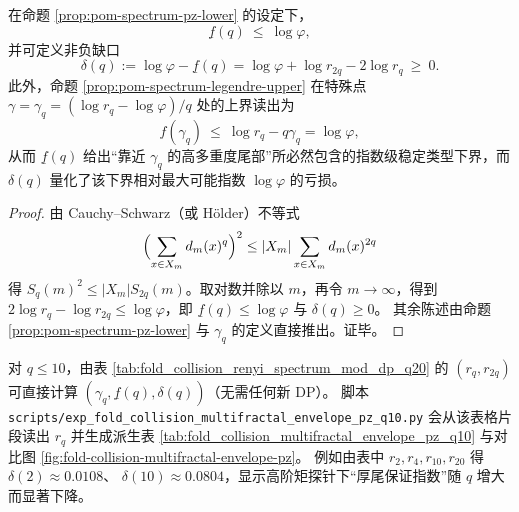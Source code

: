 \begin{corollary}\label{cor:pom-spectrum-intermittency-deficit}
在命题 \ref{prop:pom-spectrum-pz-lower} 的设定下，
\[
\underline f(q)\ \le\ \log\varphi,
\]
并可定义非负缺口
\[
\boxed{\;
\delta(q):=\log\varphi-\underline f(q)
=\log\varphi+\log r_{2q}-2\log r_q\ \ge\ 0.\;}
\]
此外，命题 \ref{prop:pom-spectrum-legendre-upper} 在特殊点
\(
\gamma=\gamma_q=(\log r_q-\log\varphi)/q
\)
处的上界读出为
\[
f(\gamma_q)\ \le\ \log r_q-q\gamma_q=\log\varphi,
\]
从而 \(\underline f(q)\) 给出“靠近 \(\gamma_q\) 的高多重度尾部”所必然包含的指数级稳定类型下界，而 \(\delta(q)\) 量化了该下界相对最大可能指数 \(\log\varphi\) 的亏损。
\end{corollary}
\begin{proof}
由 Cauchy--Schwarz（或 Hölder）不等式
\[
\Bigl(\sum_{x\in X_m}d_m(x)^q\Bigr)^2\le |X_m|\sum_{x\in X_m}d_m(x)^{2q}
\]
得 \(S_q(m)^2\le |X_m|S_{2q}(m)\)。取对数并除以 \(m\)，再令 \(m\to\infty\)，得到
\(
2\log r_q-\log r_{2q}\le \log\varphi
\)，即 \(\underline f(q)\le\log\varphi\) 与 \(\delta(q)\ge 0\)。
其余陈述由命题 \ref{prop:pom-spectrum-pz-lower} 与 \(\gamma_q\) 的定义直接推出。证毕。
\end{proof}

\begin{remark}[可复核读出：\texorpdfstring{$q\le 10$}{q<=10} 的下包络点与两侧包络图]\label{rem:pom-spectrum-pz-numerics}
对 \(q\le 10\)，由表 \ref{tab:fold_collision_renyi_spectrum_mod_dp_q20} 的 \((r_q,r_{2q})\) 可直接计算
\(
(\gamma_q,\underline f(q),\delta(q))
\)（无需任何新 DP）。
脚本 \texttt{scripts/exp\_fold\_collision\_multifractal\_envelope\_pz\_q10.py} 会从该表格片段读出 \(r_q\) 并生成派生表 \ref{tab:fold_collision_multifractal_envelope_pz_q10} 与对比图 \ref{fig:fold-collision-multifractal-envelope-pz}。
例如由表中 \(r_2,r_4,r_{10},r_{20}\) 得
\(
\delta(2)\approx 0.0108
\)、
\(
\delta(10)\approx 0.0804
\)，显示高阶矩探针下“厚尾保证指数”随 \(q\) 增大而显著下降。


\end{remark}

